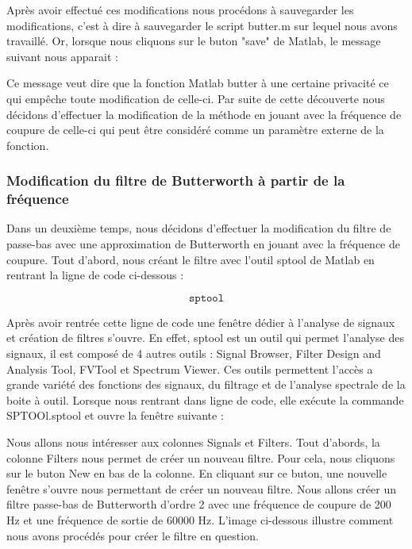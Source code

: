 \documentclass[conference,onecolumn]{IEEEtran}
\begin{document}
Après avoir effectué ces modifications nous procédons à sauvegarder les modifications, c'est à dire à sauvegarder le script butter.m sur lequel nous avons travaillé. Or, lorsque nous cliquons sur le buton "save" de Matlab, le message suivant nous apparait :


Ce message veut dire que la fonction Matlab butter à une certaine privacité ce qui empêche toute modification de celle-ci. Par suite de cette découverte nous décidons d’effectuer la modification de la méthode en jouant avec la fréquence de coupure de celle-ci qui peut être considéré comme un paramètre externe de la fonction.

\subsubsection{Modification du filtre de Butterworth à partir de la fréquence}
Dans un deuxième temps, nous décidons d'effectuer la modification du filtre de passe-bas avec une approximation de Butterworth en jouant avec la fréquence de coupure. Tout d'abord, nous créant le filtre avec l'outil sptool de Matlab en rentrant la ligne de code ci-dessous :

\[\texttt{sptool}\]

Après avoir rentrée cette ligne de code une fenêtre dédier à l'analyse de signaux et création de filtres s'ouvre. En effet, sptool est un outil qui permet l'analyse des signaux, il est composé de 4 autres outils : Signal Browser, Filter Design and Analysis Tool, FVTool et Spectrum Viewer. Ces outils permettent l'accès a grande variété des fonctions des signaux, du filtrage et de l'analyse spectrale de la boite à outil. Lorsque nous rentrant dans ligne de code, elle exécute la commande SPTOOl.sptool et ouvre la fenêtre suivante :


Nous allons nous intéresser aux colonnes Signals et Filters. Tout d'abords, la colonne Filters nous permet de créer un nouveau filtre. Pour cela, nous cliquons sur le buton New en bas de la colonne. En cliquant sur ce buton, une nouvelle fenêtre s'ouvre nous permettant de créer un nouveau filtre. Nous allons créer un filtre passe-bas de Butterworth d'ordre 2 avec une fréquence de coupure de 200 Hz et une fréquence de sortie de 60000 Hz. L'image ci-dessous illustre comment nous avons procédés pour créer le filtre en question.

\end{document}

